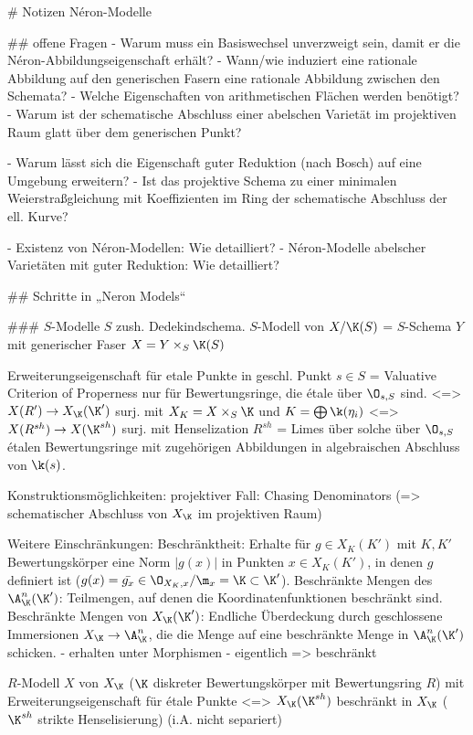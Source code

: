 # Notizen Néron-Modelle

## offene Fragen
- Warum muss ein Basiswechsel unverzweigt sein, damit er die
  Néron-Abbildungseigenschaft erhält?
- Wann/wie induziert eine rationale Abbildung auf den generischen
  Fasern eine rationale Abbildung zwischen den Schemata?
- Welche Eigenschaften von arithmetischen Flächen werden benötigt?
- Warum ist der schematische Abschluss einer abelschen Varietät im
  projektiven Raum glatt über dem generischen Punkt?

- Warum lässt sich die Eigenschaft guter Reduktion (nach Bosch) auf
  eine Umgebung erweitern?
- Ist das projektive Schema zu einer minimalen Weierstraßgleichung mit
  Koeffizienten im Ring der schematische Abschluss der ell. Kurve?

- Existenz von Néron-Modellen: Wie detailliert?
- Néron-Modelle abelscher Varietäten mit guter Reduktion: Wie detailliert?
  

## Schritte in „Neron Models“

### $S$-Modelle 
$S$ zush. Dedekindschema.
$S$-Modell von $X/\K(S)$ = $S$-Schema $Y$ mit generischer Faser $X=Y \times_S \K(S)$

Erweiterungseigenschaft für etale Punkte in geschl. Punkt $s\in S$
= Valuative Criterion of Properness nur für Bewertungsringe, die étale
über $\O_{s,S}$ sind.
<=> $X(R') \to X_\K(\K')$ surj.
    mit $X_K=X \times_S \K$ und $K=\bigoplus \k(\eta_i)$
<=> $X(R^{sh}) \to X(\K^{sh})$ surj.
    mit Henselization $R^{sh}$ = Limes über solche über $\O_{s,S}$ étalen
    Bewertungsringe mit zugehörigen Abbildungen in algebraischen Abschluss
    von $\k(s)$.

Konstruktionsmöglichkeiten:
projektiver Fall: Chasing Denominators (=> schematischer Abschluss von
$X_\K$ im projektiven Raum)

Weitere Einschränkungen:
Beschränktheit: Erhalte für $g\in X_K(K')$ mit $K,K'$ Bewertungskörper
eine Norm $|g(x)|$ in Punkten $x\in X_K(K')$, in denen $g$ definiert
ist ($g(x)=\bar{g_x}\in \O_{X_K,x}/\m_x=\K\subset\K' $).
Beschränkte Mengen des $\A_\K^n(\K')$: Teilmengen, auf denen die
Koordinatenfunktionen beschränkt sind.
Beschränkte Mengen von $X_\K(\K')$: Endliche Überdeckung durch
geschlossene Immersionen $X_\K\to\A_\K^n$, die die Menge auf eine
beschränkte Menge in $\A_\K^n(\K')$ schicken.
- erhalten unter Morphismen
- eigentlich => beschränkt

$R$-Modell $X$ von $X_\K$ ($\K$ diskreter Bewertungskörper mit
Bewertungsring $R$) mit Erweiterungseigenschaft für étale Punkte
<=> $X_\K(\K^{sh})$ beschränkt in $X_\K$ ($\K^{sh}$ strikte
Henselisierung)
(i.A. nicht separiert)
